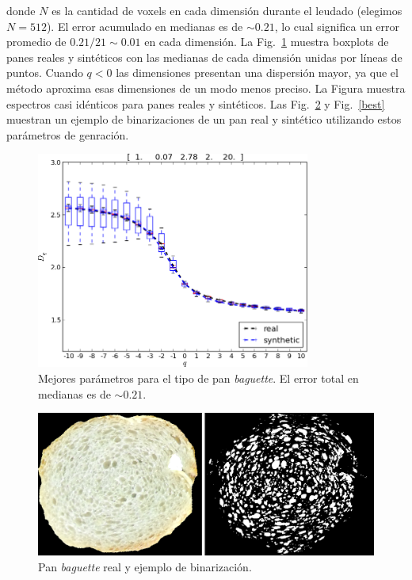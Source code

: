 donde $N$ es la cantidad de voxels en cada dimensión durante el leudado (elegimos $N = 512$). 
El error acumulado en medianas es de $\sim 0.21$, lo cual significa un error promedio de $0.21/21 \sim 0.01$ en cada dimensión.
La Fig.~\ref{bestboxplot} muestra boxplots de panes reales y sintéticos con las medianas de cada dimensión unidas por líneas de puntos.
Cuando $q < 0$ las dimensiones presentan una dispersión mayor, ya que el método aproxima esas dimensiones de un modo menos preciso.
La Figura muestra espectros casi idénticos para panes reales y sintéticos.
Las Fig.~\ref{realbin} y Fig.~\ref{best} muestran un ejemplo de binarizaciones de un pan real y sintético utilizando estos parámetros de genración.


\begin{figure}[!ht]
\includegraphics[width=9cm]{figures/bestboxplot}
\caption[Mejores parámetros de síntesis para el tipo de pan {\em baguette}]{Mejores parámetros para el tipo de pan {\em baguette}. El error total en medianas es de $\sim 0.21$.}
\label{bestboxplot}
\end{figure}

\begin{figure}[!ht]
\begin{center}
\includegraphics[width=13cm]{figures/realbin}
\caption{ Pan {\em baguette} real y ejemplo de binarización.}
\label{realbin}
\end{center}
\end{figure}

